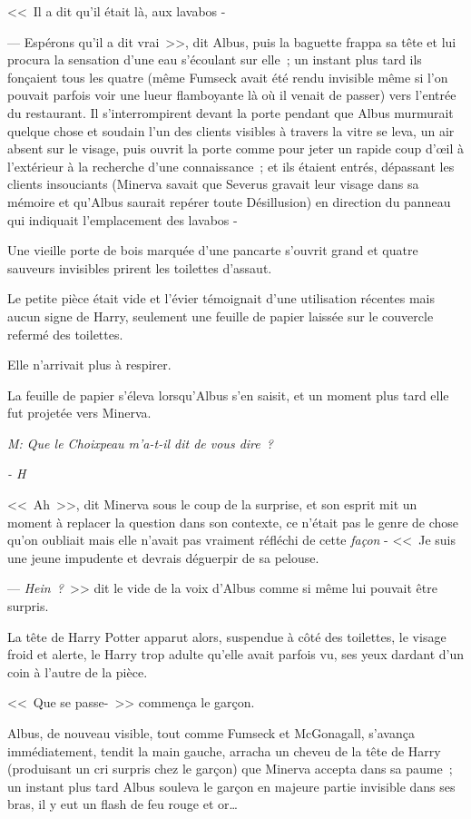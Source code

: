 <<~Il a dit qu'il était là, aux lavabos -

--- Espérons qu'il a dit vrai~>>, dit Albus, puis la baguette frappa sa tête et lui procura la sensation d'une eau s'écoulant sur elle~; un instant plus tard ils fonçaient tous les quatre (même Fumseck avait été rendu invisible même si l'on pouvait parfois voir une lueur flamboyante là où il venait de passer) vers l'entrée du restaurant. Il s'interrompirent devant la porte pendant que Albus murmurait quelque chose et soudain l'un des clients visibles à travers la vitre se leva, un air absent sur le visage, puis ouvrit la porte comme pour jeter un rapide coup d'œil à l'extérieur à la recherche d'une connaissance~; et ils étaient entrés, dépassant les clients insouciants (Minerva savait que Severus gravait leur visage dans sa mémoire et qu'Albus saurait repérer toute Désillusion) en direction du panneau qui indiquait l'emplacement des lavabos -

Une vieille porte de bois marquée d'une pancarte s'ouvrit grand et quatre sauveurs invisibles prirent les toilettes d'assaut.

Le petite pièce était vide et l'évier témoignait d'une utilisation récentes mais aucun signe de Harry, seulement une feuille de papier laissée sur le couvercle refermé des toilettes.

Elle n'arrivait plus à respirer.

La feuille de papier s'éleva lorsqu'Albus s'en saisit, et un moment plus tard elle fut projetée vers Minerva.

\emph{M: Que le Choixpeau m'a-t-il dit de vous dire~?}

\emph{- H}

<<~Ah~>>, dit Minerva sous le coup de la surprise, et son esprit mit un moment à replacer la question dans son contexte, ce n'était pas le genre de chose qu'on oubliait mais elle n'avait pas vraiment réfléchi de cette \emph{façon} - <<~Je suis une jeune impudente et devrais déguerpir de sa pelouse.

--- \emph{Hein~?}~>> dit le vide de la voix d'Albus comme si même lui pouvait être surpris.

La tête de Harry Potter apparut alors, suspendue à côté des toilettes, le visage froid et alerte, le Harry trop adulte qu'elle avait parfois vu, ses yeux dardant d'un coin à l'autre de la pièce.

<<~Que se passe-~>> commença le garçon.

Albus, de nouveau visible, tout comme Fumseck et McGonagall, s'avança immédiatement, tendit la main gauche, arracha un cheveu de la tête de Harry (produisant un cri surpris chez le garçon) que Minerva accepta dans sa paume~; un instant plus tard Albus souleva le garçon en majeure partie invisible dans ses bras, il y eut un flash de feu rouge et or…

